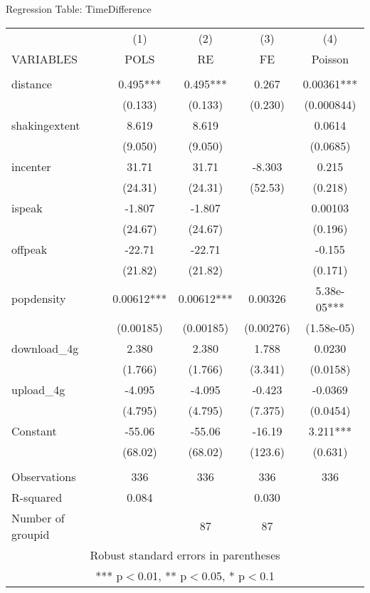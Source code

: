 \begin{frame}[fragile]{Regression Table: TimeDifference}

\begin{table}[htbp]
\tiny

\begin{tabular}{lcccc} \hline
 & (1) & (2) & (3) & (4) \\
VARIABLES & POLS & RE & FE & Poisson \\ \hline
 &  &  &  &  \\
distance & 0.495*** & 0.495*** & 0.267 & 0.00361*** \\
 & (0.133) & (0.133) & (0.230) & (0.000844) \\
shakingextent & 8.619 & 8.619 &  & 0.0614 \\
 & (9.050) & (9.050) &  & (0.0685) \\
incenter & 31.71 & 31.71 & -8.303 & 0.215 \\
 & (24.31) & (24.31) & (52.53) & (0.218) \\
ispeak & -1.807 & -1.807 &  & 0.00103 \\
 & (24.67) & (24.67) &  & (0.196) \\
offpeak & -22.71 & -22.71 &  & -0.155 \\
 & (21.82) & (21.82) &  & (0.171) \\
popdensity & 0.00612*** & 0.00612*** & 0.00326 & 5.38e-05*** \\
 & (0.00185) & (0.00185) & (0.00276) & (1.58e-05) \\
download\_4g & 2.380 & 2.380 & 1.788 & 0.0230 \\
 & (1.766) & (1.766) & (3.341) & (0.0158) \\
upload\_4g & -4.095 & -4.095 & -0.423 & -0.0369 \\
 & (4.795) & (4.795) & (7.375) & (0.0454) \\
Constant & -55.06 & -55.06 & -16.19 & 3.211*** \\
 & (68.02) & (68.02) & (123.6) & (0.631) \\
 &  &  &  &  \\
Observations & 336 & 336 & 336 & 336 \\
R-squared & 0.084 &  & 0.030 &  \\
 Number of groupid &  & 87 & 87 &  \\ \hline
\multicolumn{5}{c}{ Robust standard errors in parentheses} \\
\multicolumn{5}{c}{ *** p$<$0.01, ** p$<$0.05, * p$<$0.1} \\
\end{tabular}


\end{table}
\end{frame}



